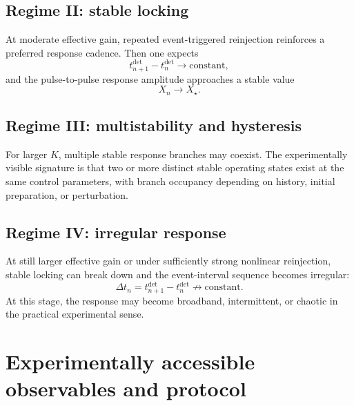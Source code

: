 \documentclass[11pt,a4paper]{article}
\begin{document}
\subsection{Regime II: stable locking}

At moderate effective gain, repeated event-triggered reinjection reinforces a preferred response cadence. Then one expects
\begin{equation}
t_{n+1}^{\mathrm{det}}-t_n^{\mathrm{det}} \to \text{constant},
\end{equation}
and the pulse-to-pulse response amplitude approaches a stable value
\begin{equation}
X_n \to X_\star.
\end{equation}

\subsection{Regime III: multistability and hysteresis}

For larger $K$, multiple stable response branches may coexist. The experimentally visible signature is that two or more distinct stable operating states exist at the same control parameters, with branch occupancy depending on history, initial preparation, or perturbation.

\subsection{Regime IV: irregular response}

At still larger effective gain or under sufficiently strong nonlinear reinjection, stable locking can break down and the event-interval sequence becomes irregular:
\begin{equation}
\Delta t_n = t_{n+1}^{\mathrm{det}}-t_n^{\mathrm{det}}
\not\to \text{constant}.
\end{equation}
At this stage, the response may become broadband, intermittent, or chaotic in the practical experimental sense.

\section{Experimentally accessible observables and protocol}
\end{document}
